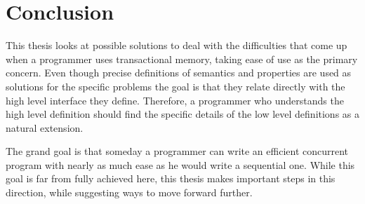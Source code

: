 




\section{Conclusion}
This thesis looks at possible solutions to deal with the difficulties that come up when
a programmer uses transactional memory, taking ease of use as the primary concern.
Even though precise definitions of semantics and properties are used as solutions
for the specific problems the goal is that they relate directly with the high level interface they define.
Therefore, a programmer who
understands the high level definition should find the specific details of the low level definitions as a
natural extension.

The grand goal is that someday a programmer can write an efficient concurrent program
with nearly as much ease as he would write a sequential one.
While this goal is far from fully achieved here,
this thesis makes important steps in this direction, while suggesting ways to move forward further.






